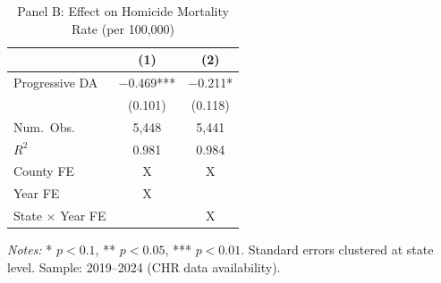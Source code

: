 \begin{table}[ht]
\centering
\caption{Panel B: Effect on Homicide Mortality Rate (per 100,000)}
\label{tab:homicide}
\begin{tabular}{lcc}
\toprule
 & (1) & (2) \\
\midrule
Progressive DA & $-$0.469*** & $-$0.211* \\
 & (0.101) & (0.118) \\
\midrule
Num.\ Obs. & 5,448 & 5,441 \\
$R^2$ & 0.981 & 0.984 \\
County FE & X & X \\
Year FE & X &  \\
State $\times$ Year FE &  & X \\
\bottomrule
\end{tabular}
\begin{minipage}{\textwidth}
\vspace{0.5em}
\small \textit{Notes:} * $p < 0.1$, ** $p < 0.05$, *** $p < 0.01$. Standard errors clustered at state level. Sample: 2019--2024 (CHR data availability).
\end{minipage}
\end{table}
